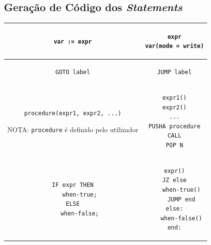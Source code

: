 \documentclass[12pt, a4paper]{article}
\begin{document}
\subsection{Geração de Código dos \emph{Statements}}
\label{statements-codegen}

\begin{longtable}{|c|c|}
    \hline
    \begin{minipage}{0.5\textwidth}
        \begin{lstlisting}
var := expr
\end{lstlisting}
    \end{minipage} &
    \begin{minipage}{0.5\textwidth}
        \begin{lstlisting}
expr
var(mode = write)
\end{lstlisting}
    \end{minipage} \\

    \hline
    \begin{minipage}{0.5\textwidth}
        \begin{lstlisting}
GOTO label
\end{lstlisting}
    \end{minipage} &
    \begin{minipage}{0.5\textwidth}
        \begin{lstlisting}
JUMP label
\end{lstlisting}
    \end{minipage} \\

    \hline
    \begin{minipage}{0.5\textwidth}
        \begin{lstlisting}
procedure(expr1, expr2, ...)
\end{lstlisting}

    NOTA: \texttt{procedure} é definido pelo utilizador
    \end{minipage} &
    \begin{minipage}{0.5\textwidth}
        \begin{lstlisting}
expr1()
expr2()
...
PUSHA procedure
CALL
POP N
\end{lstlisting}
    \end{minipage} \\

    \hline
    \begin{minipage}{0.5\textwidth}
        \begin{lstlisting}
IF expr THEN
    when-true;
ELSE
    when-false;
\end{lstlisting}
    \end{minipage} &
    \begin{minipage}{0.5\textwidth}
        \begin{lstlisting}
expr()
JZ else
    when-true()
    JUMP end
else:
    when-false()
end:
\end{lstlisting}
    \end{minipage} \\


\end{longtable}
\end{document}
